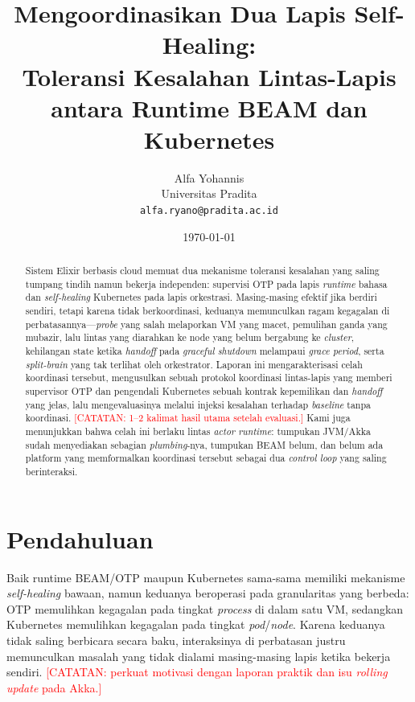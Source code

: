 \documentclass[11pt,a4paper]{report}
\title{\textbf{Mengoordinasikan Dua Lapis Self-Healing:}\\[4pt]
Toleransi Kesalahan Lintas-Lapis antara Runtime BEAM dan Kubernetes}
\author{Alfa Yohannis\\ Universitas Pradita \\ \texttt{alfa.ryano@pradita.ac.id}}
\date{\today}
\newcommand{\todo}[1]{\textcolor{red}{[CATATAN: #1]}}
\begin{document}
\maketitle

\begin{abstract}
\noindent Sistem Elixir berbasis cloud memuat dua mekanisme toleransi kesalahan yang
saling tumpang tindih namun bekerja independen: supervisi OTP pada lapis \emph{runtime}
bahasa dan \emph{self-healing} Kubernetes pada lapis orkestrasi. Masing-masing
efektif jika berdiri sendiri, tetapi karena tidak berkoordinasi, keduanya memunculkan
ragam kegagalan di perbatasannya---\emph{probe} yang salah melaporkan VM yang macet,
pemulihan ganda yang mubazir, lalu lintas yang diarahkan ke node yang belum bergabung ke
\emph{cluster}, kehilangan state ketika \emph{handoff} pada \emph{graceful shutdown}
melampaui \emph{grace period}, serta \emph{split-brain} yang tak terlihat oleh
orkestrator. Laporan ini mengarakterisasi celah koordinasi tersebut, mengusulkan sebuah
protokol koordinasi lintas-lapis yang memberi supervisor OTP dan pengendali Kubernetes
sebuah kontrak kepemilikan dan \emph{handoff} yang jelas, lalu mengevaluasinya melalui
injeksi kesalahan terhadap \emph{baseline} tanpa koordinasi. \todo{1--2 kalimat hasil
utama setelah evaluasi.} Kami juga menunjukkan bahwa celah ini berlaku lintas
\emph{actor runtime}: tumpukan JVM/Akka sudah menyediakan sebagian \emph{plumbing}-nya,
tumpukan BEAM belum, dan belum ada platform yang memformalkan koordinasi tersebut
sebagai dua \emph{control loop} yang saling berinteraksi.
\end{abstract}

\tableofcontents

\chapter{Pendahuluan}
\label{ch:intro}
Baik runtime BEAM/OTP maupun Kubernetes sama-sama memiliki mekanisme \emph{self-healing} bawaan,
namun keduanya beroperasi pada granularitas yang berbeda: OTP memulihkan kegagalan pada
tingkat \emph{process} di dalam satu VM, sedangkan Kubernetes memulihkan kegagalan pada
tingkat \emph{pod}/\emph{node}. Karena keduanya tidak saling berbicara secara baku,
interaksinya di perbatasan justru memunculkan masalah yang tidak dialami masing-masing
lapis ketika bekerja sendiri. \todo{perkuat motivasi dengan laporan praktik dan isu
\emph{rolling update} pada Akka.}
\end{document}
